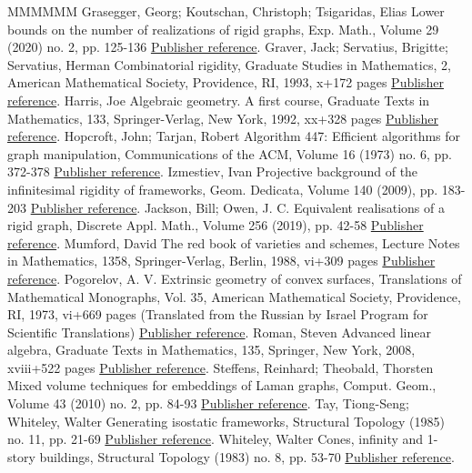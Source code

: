 \begin{thebibliography}{MMMMMM}
 Grasegger, Georg; Koutschan, Christoph; Tsigaridas, Elias Lower bounds on the number of realizations of rigid graphs, Exp. Math., Volume 29 (2020) no. 2, pp. 125-136 \href{https://alco.centre-mersenne.org/articles/10.5802/alco.390/#LowerBounds}{Publisher reference}.
 Graver, Jack; Servatius, Brigitte; Servatius, Herman Combinatorial rigidity, Graduate Studies in Mathematics, 2, American Mathematical Society, Providence, RI, 1993, x+172 pages \href{https://alco.centre-mersenne.org/articles/10.5802/alco.390/#GraverServatius}{Publisher reference}.
 Harris, Joe Algebraic geometry. A first course, Graduate Texts in Mathematics, 133, Springer-Verlag, New York, 1992, xx+328 pages \href{https://alco.centre-mersenne.org/articles/10.5802/alco.390/#Harris}{Publisher reference}.
 Hopcroft, John; Tarjan, Robert Algorithm 447: Efficient algorithms for graph manipulation, Communications of the ACM, Volume 16 (1973) no. 6, pp. 372-378 \href{https://alco.centre-mersenne.org/articles/10.5802/alco.390/#HopcroftTarjan}{Publisher reference}.
 Izmestiev, Ivan Projective background of the infinitesimal rigidity of frameworks, Geom. Dedicata, Volume 140 (2009), pp. 183-203 \href{https://alco.centre-mersenne.org/articles/10.5802/alco.390/#Izm09}{Publisher reference}.
 Jackson, Bill; Owen, J. C. Equivalent realisations of a rigid graph, Discrete Appl. Math., Volume 256 (2019), pp. 42-58 \href{https://alco.centre-mersenne.org/articles/10.5802/alco.390/#JacksonOwen}{Publisher reference}.
 Mumford, David The red book of varieties and schemes, Lecture Notes in Mathematics, 1358, Springer-Verlag, Berlin, 1988, vi+309 pages \href{https://alco.centre-mersenne.org/articles/10.5802/alco.390/#mumford}{Publisher reference}.
 Pogorelov, A. V. Extrinsic geometry of convex surfaces, Translations of Mathematical Monographs, Vol. 35, American Mathematical Society, Providence, RI, 1973, vi+669 pages (Translated from the Russian by Israel Program for Scientific Translations) \href{https://alco.centre-mersenne.org/articles/10.5802/alco.390/#Pog73}{Publisher reference}.
 Roman, Steven Advanced linear algebra, Graduate Texts in Mathematics, 135, Springer, New York, 2008, xviii+522 pages \href{https://alco.centre-mersenne.org/articles/10.5802/alco.390/#roman}{Publisher reference}.
 Steffens, Reinhard; Theobald, Thorsten Mixed volume techniques for embeddings of Laman graphs, Comput. Geom., Volume 43 (2010) no. 2, pp. 84-93 \href{https://alco.centre-mersenne.org/articles/10.5802/alco.390/#Steffens2010}{Publisher reference}.
 Tay, Tiong-Seng; Whiteley, Walter Generating isostatic frameworks, Structural Topology (1985) no. 11, pp. 21-69 \href{https://alco.centre-mersenne.org/articles/10.5802/alco.390/#TayWhite85}{Publisher reference}.
 Whiteley, Walter Cones, infinity and 1-story buildings, Structural Topology (1983) no. 8, pp. 53-70 \href{https://alco.centre-mersenne.org/articles/10.5802/alco.390/#coning}{Publisher reference}.
\end{thebibliography}
